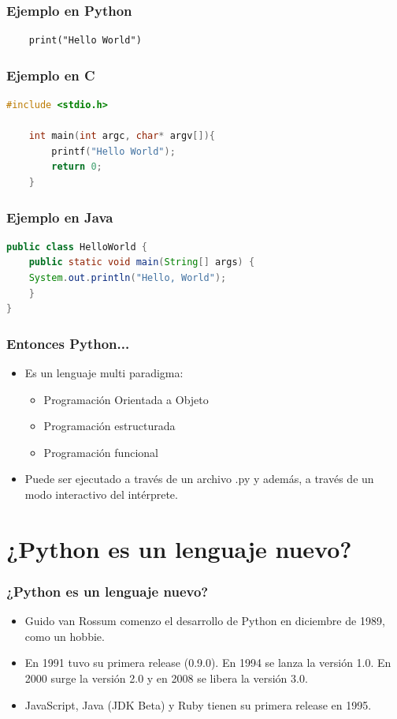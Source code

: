 \documentclass[spanish]{beamer}
\begin{document}
\begin{frame}[fragile]
	\frametitle{Ejemplo en Python}
	\begin{lstlisting}
	print("Hello World")
	\end{lstlisting}
\end{frame}

\begin{frame}[fragile]
	\frametitle{Ejemplo en C}
	\begin{lstlisting}[language=c]
	#include <stdio.h>

	int main(int argc, char* argv[]){
	    printf("Hello World");
	    return 0;
	}
	\end{lstlisting}

\end{frame}

\begin{frame}[fragile]
	\frametitle{Ejemplo en Java}
	\begin{lstlisting}[language=java]
public class HelloWorld {
    public static void main(String[] args) {
    System.out.println("Hello, World");
    }
}
        \end{lstlisting}
\end{frame}

\begin{frame}
	\frametitle{Entonces Python...}
	\begin{itemize}
		\item Es un lenguaje multi paradigma:
			\begin{itemize}
				\item Programación Orientada a Objeto
				\item Programación estructurada
				\item Programación funcional
			\end{itemize}
		\item Puede ser ejecutado a través de un archivo .py y además,
			a través de un modo interactivo del intérprete.
	\end{itemize}
\end{frame}

\section{¿Python es un lenguaje nuevo?}
\begin{frame}
	\frametitle{¿Python es un lenguaje nuevo?}
	\begin{itemize}
		\item Guido van Rossum comenzo el desarrollo de Python en
			diciembre de 1989, como un hobbie.
		\item En 1991 tuvo su primera release (0.9.0). En 1994 se lanza
			la versión 1.0. En 2000 surge la versión 2.0 y en 2008
			se libera la versión 3.0.
		\item JavaScript, Java (JDK Beta) y Ruby tienen su primera release en 1995.
	\end{itemize}
\end{frame}
\end{document}
